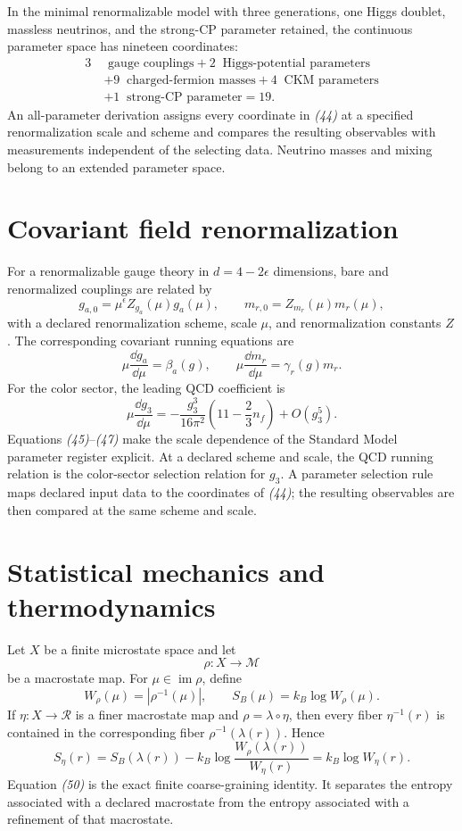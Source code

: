 In the minimal renormalizable model with three generations, one Higgs
doublet, massless neutrinos, and the strong-CP parameter retained, the
continuous parameter space has nineteen coordinates:
\[
\begin{aligned}
3\ &\text{ gauge couplings}
+2\ \text{ Higgs-potential parameters}\\
&+9\ \text{ charged-fermion masses}
+4\ \text{ CKM parameters}\\
&+1\ \text{ strong-CP parameter}=19.
\end{aligned}
\tag{44}
\]
An all-parameter derivation assigns every coordinate in \emph{(44)} at a
specified renormalization scale and scheme and compares the resulting
observables with measurements independent of the selecting data.  Neutrino
masses and mixing belong to an extended parameter space.

\section{Covariant field renormalization}

For a renormalizable gauge theory in $d=4-2\epsilon$ dimensions, bare and
renormalized couplings are related by
\[
g_{a,0}=\mu^\epsilon Z_{g_a}(\mu)g_a(\mu),
\qquad
m_{r,0}=Z_{m_r}(\mu)m_r(\mu),
\tag{45}
\]
with a declared renormalization scheme, scale $\mu$, and renormalization
constants $Z$.  The corresponding covariant running equations are
\[
\mu\frac{\dd g_a}{\dd\mu}=\beta_a(g),
\qquad
\mu\frac{\dd m_r}{\dd\mu}=\gamma_r(g)m_r.
\tag{46}
\]
For the color sector, the leading QCD coefficient is
\[
\mu\frac{\dd g_3}{\dd\mu}
=-\frac{g_3^3}{16\pi^2}
\left(11-\frac23n_f\right)+O(g_3^5).
\tag{47}
\]
Equations \emph{(45)}--\emph{(47)} make the scale dependence of the Standard
Model parameter register explicit.  At a declared scheme and scale, the QCD
running relation is the color-sector selection relation for $g_3$.  A parameter
selection rule maps declared input data to the coordinates of \emph{(44)}; the
resulting observables are then compared at the same scheme and scale.

\section{Statistical mechanics and thermodynamics}

Let $X$ be a finite microstate space and let
\[
\rho:X\longrightarrow\mathcal M
\tag{48}
\]
be a macrostate map.  For $\mu\in\operatorname{im}\rho$, define
\[
W_\rho(\mu)=|\rho^{-1}(\mu)|,\qquad
S_B(\mu)=k_B\log W_\rho(\mu).
\tag{49}
\]
If $\eta:X\to\mathcal R$ is a finer macrostate map and
$\rho=\lambda\circ\eta$, then every fiber $\eta^{-1}(r)$ is contained in
the corresponding fiber $\rho^{-1}(\lambda(r))$.  Hence
\[
S_\eta(r)
=S_B(\lambda(r))
-k_B\log\frac{W_\rho(\lambda(r))}{W_\eta(r)}
=k_B\log W_\eta(r).
\tag{50}
\]
Equation \emph{(50)} is the exact finite coarse-graining identity.  It
separates the entropy associated with a declared macrostate from the entropy
associated with a refinement of that macrostate.


